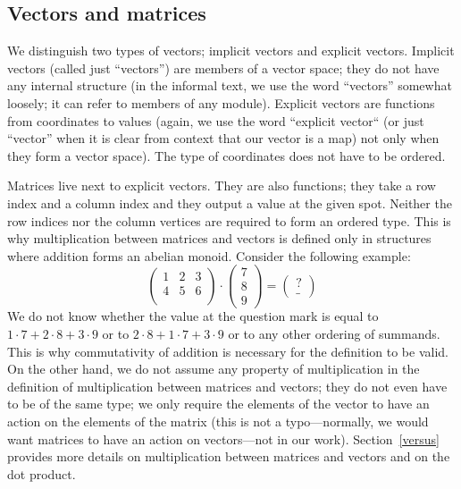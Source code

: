 \documentclass[]{article}
\renewcommand{\.}{\hskip .75pt}
\newcommand{\sekt}[1]{Section~\ref{#1}}
\let\*=\cdot
\begin{document}
\subsection{Vectors and matrices}
\label{preliminaries-vectors}

We distinguish two types of vectors; implicit vectors and explicit vectors.
Implicit vectors (called just ``vectors'') are members of a vector space;
they do not have any internal structure
(in the informal text, we use the word ``vectors'' somewhat loosely;
it can refer to members of any module).
Explicit vectors are functions from coordinates to values (again, we use the word
``explicit vector`` (or just ``vector'' when it is clear from context that our vector
is a map) not only when they form a vector space).
The type of coordinates does not have to be ordered.

Matrices live next to explicit vectors. They are also functions; they take a row index
and a column index and they output a value at the given spot.
Neither the row indices nor the column vertices are required to form an ordered type.
This is why multiplication between matrices and vectors is defined only in structures
where addition forms an abelian monoid. Consider the following example:
$$
\begin{pmatrix}
	1 & 2 & 3 \\
	4 & 5 & 6 \\
\end{pmatrix}
\*
\begin{pmatrix}
	7 \\ 8 \\ 9
\end{pmatrix}
=
\begin{pmatrix}
	? \\ \_
\end{pmatrix}
$$
We do not know whether the value at the question mark is equal to
$ 1 \* 7 + 2 \* 8 + 3 \* 9 $ or to
$ 2 \* 8 + 1 \* 7 + 3 \* 9 $ or to
any other ordering of summands.
This is why commutativity of addition is necessary for the definition to be valid.
On the other hand, we do not assume any property of multiplication in the
definition of multiplication between matrices and vectors; they do not even
have to be of the same type; we only require the elements of the vector
to have an action on the elements of the matrix (this is not a typo\:---\:normally,
we would want matrices to have an action on vectors\:---\:not in our work).
\sekt{versus} provides more details on multiplication between matrices and vectors
and on the dot product.
\end{document}
